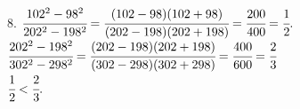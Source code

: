 8. $\cfrac{102^2-98^2}{202^2-198^2}=\cfrac{(102-98)(102+98)}{(202-198)(202+198)}=\cfrac{200}{400}=\cfrac{1}{2}.$\\
$\cfrac{202^2-198^2}{302^2-298^2}=\cfrac{(202-198)(202+198)}{(302-298)(302+298)}=\cfrac{400}{600}=\cfrac{2}{3}$\\
$\cfrac{1}{2}<\cfrac{2}{3}.$\\
